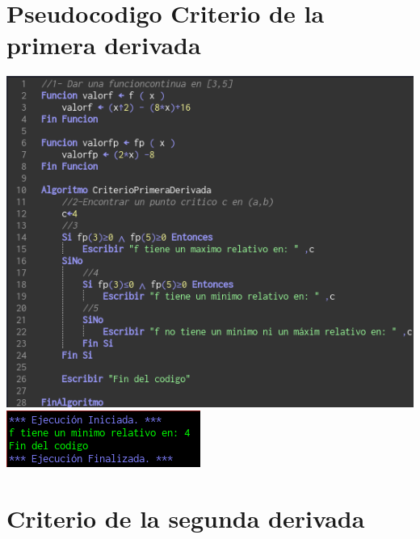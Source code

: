 \documentclass[10pt,a4paper]{article}
\begin{document}
\LARGE
\section{Pseudocodigo Criterio de la primera derivada}
\includegraphics[scale=0.5]{figuras/img1} \\ 
\includegraphics[scale=0.5]{figuras/img2}

\section{Criterio de la segunda derivada}
\end{document}
